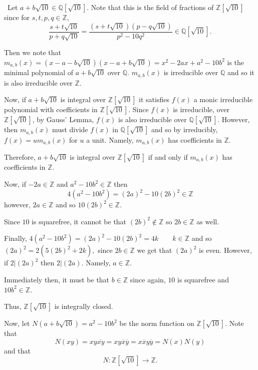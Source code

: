 \documentclass[12pt]{Qual}
\begin{document}
\begin{solution}$\,$
Let $a+b\sqrt{10}\in\mathbb{Q}[\sqrt{10}]$. Note that this is the field of fractions of $\mathbb{Z}[\sqrt{10}]$ since for $s,t,p,q\in\mathbb{Z}$, $$\frac{s+t\sqrt{10}}{p+q\sqrt{10}}=\frac{(s+t\sqrt{10})(p-q\sqrt{10})}{p^2-10q^2}\in\mathbb{Q}[\sqrt{10}].$$

Then we note that $m_{a,b}(x)=(x-a-b\sqrt{10})(x-a+b\sqrt{10})=x^2-2ax+a^2-10b^2$ is the minimal polynomial of $a+b\sqrt{10}$ over $\mathbb{Q}$. $m_{a,b}(x)$ is irreducible over $\mathbb{Q}$ and so it is also irreducible over $\mathbb{Z}$.

Now, if $a+b\sqrt{10}$ is integral over $\mathbb{Z}[\sqrt{10}]$ it satisfies $f(x)$ a monic irreducible polynomial with coefficients in $\mathbb{Z}[\sqrt{10}]$. Since $f(x)$ is irreducible, over $\mathbb{Z}[\sqrt{10}]$, by Gauss' Lemma, $f(x)$ is also irreducible over $\mathbb{Q}[\sqrt{10}]$. However, then $m_{a,b}(x)$ must divide $f(x)$ in $\mathbb{Q}[\sqrt{10}]$ and so by irreducibly, $f(x)=um_{a,b}(x)$ for $u$ a unit. Namely, $m_{a,b}(x)$ has coefficients in $\mathbb{Z}$.

Therefore, $a+b\sqrt{10}$ is integral over $\mathbb{Z}[\sqrt{10}]$ if and only if $m_{a,b}(x)$ has coefficients in $\mathbb{Z}$.

Now, if $-2a\in\mathbb{Z}$ and $a^2-10b^2\in\mathbb{Z}$ then $$4(a^2-10b^2)=(2a)^2-10(2b)^2\in\mathbb{Z}$$ however, $2a\in\mathbb{Z}$ and so $10(2b)^2\in\mathbb{Z}$.

Since $10$ is squarefree, it cannot be that $(2b)^2\notin\mathbb{Z}$ so $2b\in\mathbb{Z}$ as well.

Finally, $4(a^2-10b^2)=(2a)^2-10(2b)^2=4k\qquad k\in\mathbb{Z}$ and so $(2a)^2=2(5(2b)^2+2k),$ since $2b\in\mathbb{Z}$ we get that $(2a)^2$ is even. However, if $2|(2a)^2$ then $2|(2a)$. Namely, $a\in\mathbb{Z}$.

Immediately then, it must be that $b\in\mathbb{Z}$ since again, $10$ is squarefree and $10b^2\in\mathbb{Z}$.

Thus, $\mathbb{Z}[\sqrt{10}]$ is integrally closed.

Now, let $N(a+b\sqrt{10})=a^2-10b^2$ be the norm function on $\mathbb{Z}[\sqrt{10}]$. Note that $$N(xy)=xy\overline{xy}=xy\overline{x}\overline{y}=x\overline{x}y\overline{y}=N(x)N(y)$$ and that $$N:\mathbb{Z}[\sqrt{10}]\to\mathbb{Z}.$$


\end{solution}
\end{document}

